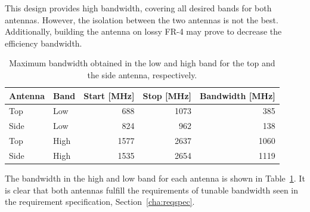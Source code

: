 This design provides high bandwidth, covering all desired bands for both antennas. However, the isolation between the two antennas is not the best. Additionally, building the antenna on lossy FR-4 may prove to decrease the efficiency bandwidth. 

\begin{table}[htbp]
    \centering
    \begin{tabular}{|l|l|r|r|r|}
        \hline
        Antenna & Band & Start [MHz] & Stop [MHz] & Bandwidth [MHz] \\
        \hline
        Top     & Low  & 688         & 1073       & 385 \\
        Side    & Low  & 824         & 962        & 138 \\
        \hline
        Top     & High & 1577        & 2637       & 1060 \\
        Side    & High & 1535        & 2654       & 1119 \\
        \hline
    \end{tabular}
    \caption{Maximum bandwidth obtained in the low and high band for the top and the side antenna, respectively.}
    \label{tab:bw_sol2}
\end{table}

The bandwidth in the high and low band for each antenna is shown in Table~\ref{tab:bw_sol2}. It is clear that both antennas fulfill the requirements of tunable bandwidth seen in the requirement specification, Section~\ref{cha:reqspec}.


